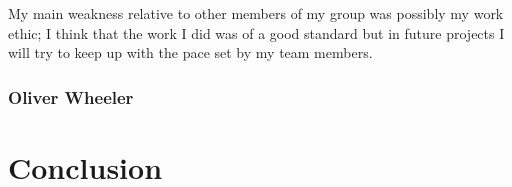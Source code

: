 \documentclass[11pt]{article}
\begin{document}
My main weakness relative to other members of my group was possibly my work
ethic; I think that the work I did was of a good standard but in future
projects I will try to keep up with the pace set by my team members.



\subsubsection*{Oliver Wheeler}

\section{Conclusion}
\end{document}
